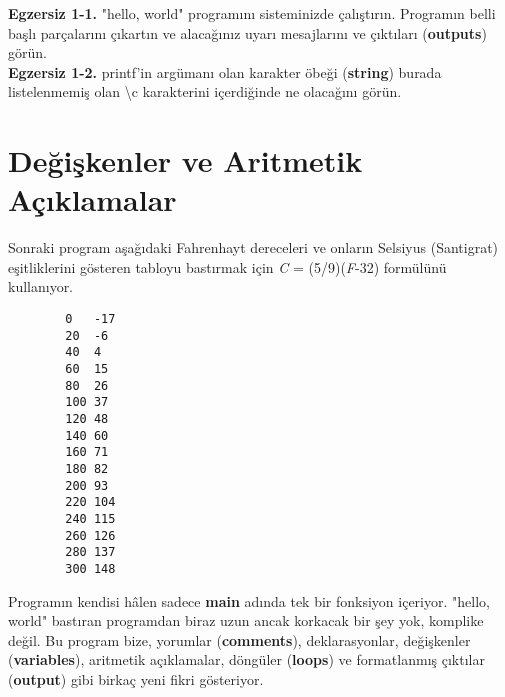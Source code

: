 \documentclass[a4paper,12pt,oneside]{book}
\begin{document}
\noindent \textbf{Egzersiz 1-1.} "hello, world" programını sisteminizde çalıştırın. Programın belli başlı parçalarını çıkartın ve alacağınız uyarı mesajlarını ve çıktıları (\textbf{outputs}) görün. \\

\noindent \textbf{Egzersiz 1-2.} printf'in argümanı  olan karakter öbeği (\textbf{string}) burada listelenmemiş olan \textbackslash c karakterini içerdiğinde ne olacağını görün.

\section{Değişkenler ve Aritmetik Açıklamalar}

Sonraki program aşağıdaki Fahrenhayt dereceleri ve onların Selsiyus (Santigrat) eşitliklerini gösteren tabloyu bastırmak için \degree \textit{C} = (5/9)(\degree \textit{F}-32) formülünü kullanıyor. \pagebreak

\begin{lstlisting}
        0   -17
        20  -6
        40  4
        60  15
        80  26
        100 37
        120 48
        140 60
        160 71
        180 82
        200 93
        220 104
        240 115
        260 126
        280 137
        300 148
\end{lstlisting}
\par Programın kendisi hâlen sadece \textbf{main} adında tek bir fonksiyon  içeriyor. "hello, world" bastıran programdan biraz uzun ancak korkacak bir şey yok, komplike değil. Bu program bize, yorumlar (\textbf{comments}), deklarasyonlar, değişkenler (\textbf{variables}), aritmetik açıklamalar, döngüler (\textbf{loops}) ve formatlanmış çıktılar (\textbf{output}) gibi birkaç yeni fikri gösteriyor.
\end{document}

